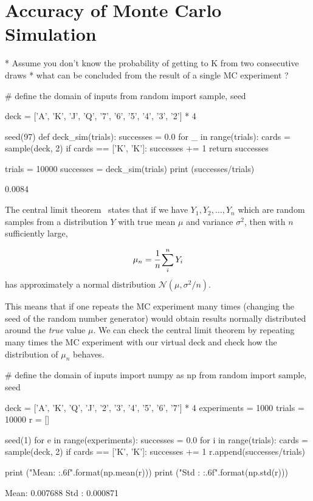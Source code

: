 \section{Accuracy of Monte Carlo Simulation}
\label{sec:confidence_interval}

* Assume you don't know the probability of getting to K from two consecutive draws
    * what can be concluded from the result of a single MC experiment ?
    
   \begin{ipython}
# define the domain of inputs
from random import sample, seed

deck = ['A', 'K', 'J', 'Q', '7', '6', '5', '4', '3', '2'] * 4

seed(97)
def deck_sim(trials):
    successes = 0.0
    for _ in range(trials):
        cards = sample(deck, 2)
        if cards == ['K', 'K']:
            successes += 1
    return successes

trials = 10000
successes = deck_sim(trials)
print (successes/trials)
   \end{ipython}
\begin{ioutput}
0.0084
\end{ioutput}

The central limit  theorem~\cite{bib:central_limit} states that if we have \(Y_1, Y_2,\dots, Y_n\) which are random samples from a distribution \(Y\) with true mean \(\mu\) and variance \(\sigma^{2}\), then with \(n\) sufficiently large,

\begin{equation*} 
\mu_n = \cfrac{1}{n}\sum_i^n Y_i
\end{equation*}
has approximately a normal distribution \(\mathcal{N}(\mu, \sigma^2/n)\).

This means that if one repeats the MC experiment many times (changing the seed of the random number generator) would obtain results normally distributed around the \emph{true} value \(\mu\).
We can check the central limit theorem by repeating many times the MC experiment with our virtual deck and check how the distribution of $\mu_n$ behaves.

\begin{ipython}
# define the domain of inputs
import numpy as np
from random import sample, seed

deck = ['A', 'K', 'Q', 'J', '2', '3', '4', '5', '6', '7'] * 4
experiments = 1000
trials = 10000
r = []

seed(1)
for e in range(experiments):
    successes = 0.0
    for i in range(trials):
        cards = sample(deck, 2)
        if cards == ['K', 'K']:
            successes += 1
    r.append(successes/trials)

print ("Mean: {:.6f}".format(np.mean(r)))
print ("Std : {:.6f}".format(np.std(r)))
\end{ipython}
\begin{ioutput}
Mean:  0.007688
Std :  0.000871
\end{ioutput}

